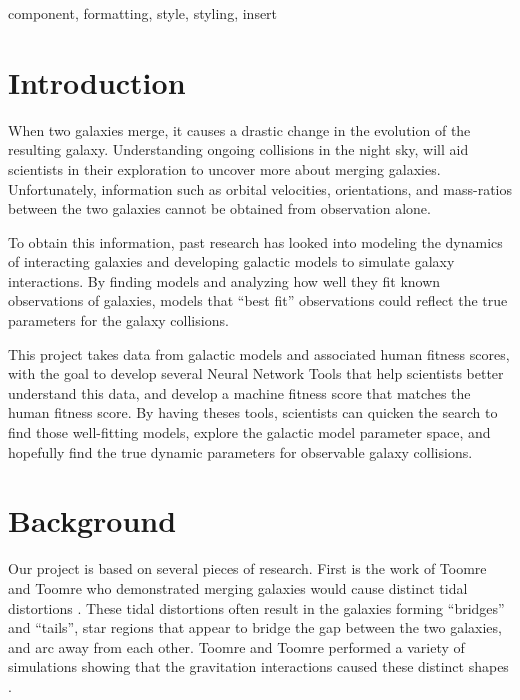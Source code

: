 \documentclass[conference]{IEEEtran}
\begin{document}
\begin{abstract}
This document is a model and instructions for \LaTeX.
This and the IEEEtran.cls file define the components of your paper [title, text, heads, etc.]. *CRITICAL: Do Not Use Symbols, Special Characters, Footnotes, 
or Math in Paper Title or Abstract.
\end{abstract}



\begin{IEEEkeywords}
component, formatting, style, styling, insert
\end{IEEEkeywords}

\section{Introduction}

When two galaxies merge, it causes a drastic change in the
evolution of the resulting galaxy. Understanding ongoing
collisions in the night sky, will aid scientists in their exploration
to uncover more about merging galaxies. Unfortunately,
information such as orbital velocities, orientations, and mass-ratios between the two galaxies cannot be obtained from
observation alone.

To obtain this information, past research has looked into
modeling the dynamics of interacting galaxies and developing
galactic models to simulate galaxy interactions. By finding
models and analyzing how well they fit known observations of
galaxies, models that “best fit” observations could reflect the
true parameters for the galaxy collisions.

This project takes data from galactic models and associated
human fitness scores, with the goal to develop several Neural
Network Tools that help scientists better understand this
data, and develop a machine fitness score that matches the
human fitness score. By having theses tools, scientists can
quicken the search to find those well-fitting models, explore
the galactic model parameter space, and hopefully find the
true dynamic parameters for observable galaxy collisions.

\section{Background}

Our project is based on several pieces of research. First is
the work of Toomre and Toomre who demonstrated merging
galaxies would cause distinct tidal distortions \cite{Toomre}. These tidal
distortions often result in the galaxies forming “bridges” and
“tails”, star regions that appear to bridge the gap between the
two galaxies, and arc away from each other. Toomre and
Toomre performed a variety of simulations showing that the
gravitation interactions caused these distinct shapes \cite{Toomre}.
\end{document}
